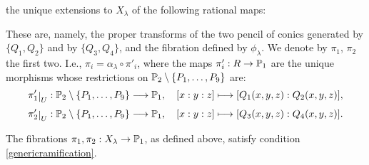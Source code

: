 \documentclass[a4paper,12pt]{article}
\begin{document}
 



the unique extensions to $X_{\lambda}$ of the following rational maps:



 These are, namely, the proper transforms of the two pencil of conics generated by $\{Q_1,Q_2\}$ and by $\{Q_3,Q_4\}$, and the fibration defined by $\phi_{\lambda}$. We denote by $\pi_1$, $\pi_2$ the first two. I.e., $\pi_i=\alpha_{\lambda} \circ \pi'_i$, where the maps $\pi'_i:R \rightarrow \P_1$ are the unique morphisms whose restrictions on $\P_2 \setminus \{P_1,\dots,P_9\}$ are:
\begin{equation}\label{fibrazioniconiche}
	\restricts{\pi'_1}{U}:\P_2 \setminus \{P_1,\dots,P_9\} \longrightarrow \P_1, \quad 
	[x:y:z]\longmapsto[Q_1(x,y,z):Q_2(x,y,z)],
\end{equation}
\begin{equation}
	\restricts{\pi'_2}{U}:\P_2 \setminus \{P_1,\dots,P_9\} \longrightarrow \P_1, \quad	[x:y:z]\longmapsto[Q_3(x,y,z):Q_4(x,y,z)].
\end{equation}


\begin{proposition}\label{exampleprop}
	The fibrations $\pi_1, \pi_2:X_{\lambda} \rightarrow \P_1$, as defined above, satisfy condition \ref{genericramification}.
\end{proposition}
\end{document}
